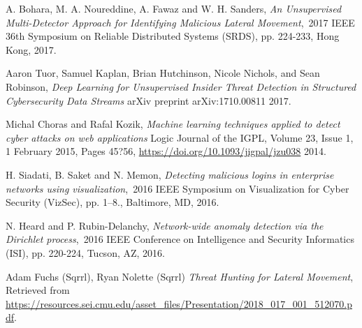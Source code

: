 \documentclass[sigconf]{acmart}
\begin{document}
\begin{thebibliography}{9}
A. Bohara, M. A. Noureddine, A. Fawaz and W. H. Sanders,
\textit{An Unsupervised Multi-Detector Approach for Identifying Malicious Lateral Movement}, 2017 IEEE 36th Symposium on Reliable Distributed Systems (SRDS), pp. 224-233,
Hong Kong, 2017.

Aaron Tuor, Samuel Kaplan, Brian Hutchinson, Nicole Nichols, and Sean Robinson,
\textit{Deep Learning for Unsupervised Insider Threat Detection in Structured Cybersecurity Data Streams}
arXiv preprint arXiv:1710.00811
2017.

Michal Choras and Rafal Kozik,
\textit{Machine learning techniques applied to detect cyber attacks on web applications}
Logic Journal of the IGPL, Volume 23, Issue 1, 1 February 2015, Pages 45?56,
\url{https://doi.org/10.1093/jigpal/jzu038}
2014.

H. Siadati, B. Saket and N. Memon,
\textit{Detecting malicious logins in enterprise networks using visualization}, 2016 IEEE Symposium on Visualization for Cyber Security (VizSec), pp. 1--8.,
Baltimore, MD, 2016.

N. Heard and P. Rubin-Delanchy,
\textit{Network-wide anomaly detection via the Dirichlet process}, 2016 IEEE Conference on Intelligence and Security Informatics (ISI), pp. 220-224,
Tucson, AZ, 2016.

Adam Fuchs (Sqrrl), Ryan Nolette (Sqrrl)
  \textit{Threat Hunting for Lateral Movement},
 Retrieved from \url{https://resources.sei.cmu.edu/asset\_files/Presentation/2018\_017\_001\_512070.pdf}.





\end{thebibliography}
\end{document}
